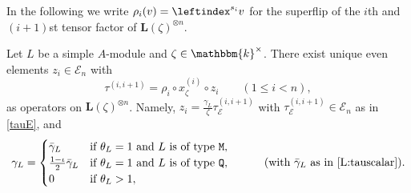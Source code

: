 \documentclass[a4paper,11pt]{amsart}
\numberwithin{equation}{subsection}
\theoremstyle{definition}
\theoremstyle{theorem}
\theoremstyle{remark}
\newcommand\kk{\mathbbm{k}}
\begin{document}
In the following we write  $\rho_i(v)=\leftindex^{s_i}v$ for the superflip of the $i$th and
  $(i+1)$st tensor factor of $\mathbf L(\zeta)^{\otimes n}$.
\begin{Lemma}\label{L:tauaction}
  Let $L$ be a simple $A$-module and $\zeta\in\kk^\times$.  There exist
  unique even elements $z_i\in\mathcal E_n$ with
 \begin{equation}\label{E:tauaction}
    \tau^{(i,i+1)}=\rho_i\circ x_\zeta^{(i)}\circ z_i\qquad(1\le i<n),
  \end{equation}
 as operators on   $\mathbf L(\zeta)^{\otimes n}$. Namely, $z_i=\tfrac{\gamma_L}{\zeta}\tau^{(i,i+1)}_{\mathcal E}$ with
  $\tau^{(i,i+1)}_{\mathcal E}\in\mathcal E_n$ as in \autoref{tauE}, and
      \begin{equation}\label{gammadef}
    \gamma_L=\begin{cases}
      \bar\gamma_L & \text{if $\theta_L=1$ and $L$ is of type $\mathtt M$},\\
      \tfrac{1-\iota}{2}\bar\gamma_L
        & \text{if $\theta_L=1$ and $L$ is of type $\mathtt Q$},\\
      0 & \text{if $\theta_L>1$},
    \end{cases} \quad\quad\quad\text{(with $\bar\gamma_L$ as in \autoref{L:tauscalar})}.
  \end{equation}
\end{Lemma}
\end{document}
